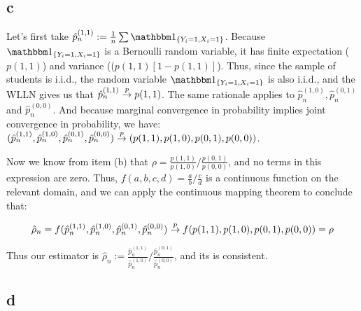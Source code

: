 \documentclass[12pt]{paper}
\begin{document}
\subsection*{c}

Let's first take $\hat{p}_{n}^{(1,1)}:=\frac{1}{n}\sum{\indicate{Y_i=1,X_i=1}}$. Because $\indicate{Y_i=1,X_i=1}$ is a Bernoulli random variable, it has finite expectation ($p(1,1)$) and variance (($p(1,1)[1-p(1,1)]$). Thus, since the sample of students is i.i.d., the random variable $\indicate{Y_i=1,X_i=1}$ is also i.i.d., and the WLLN gives us that $\hat{p}_{n}^{(1,1)}\overset{p}{\to} p(1,1)$. The same rationale applies to $\hat{p}_{n}^{(1,0)},\hat{p}_{n}^{(0,1)}$ and $\hat{p}_{n}^{(0,0)}$. And because marginal convergence in probability implies joint convergence in probability, we have: $(\hat{p}_{n}^{(1,1)},\hat{p}_{n}^{(1,0)},\hat{p}_{n}^{(0,1)},\hat{p}_{n}^{(0,0)})\overset{p}{\to}(p(1,1),p(1,0),p(0,1),p(0,0))$. 

Now we know from item (b) that $\rho=\frac{p(1,1)}{p(1,0)}\Big/\frac{p(0,1)}{p(0,0)}$, and no terms in this expression are zero. Thus, $f(a,b,c,d)=\frac{a}{b}\Big/\frac{c}{d}$ is a continuous function on the relevant domain, and we can apply the continuous mapping theorem to conclude that:

\begin{equation}
\hat{\rho}_n=f(\hat{p}_{n}^{(1,1)},\hat{p}_{n}^{(1,0)},\hat{p}_{n}^{(0,1)},\hat{p}_{n}^{(0,0)})\overset{p}{\to} f(p(1,1),p(1,0),p(0,1),p(0,0))=\rho
\end{equation}

Thus our estimator is $\hat{\rho}_n :=\frac{\hat{p}_{n}^{(1,1)}}{\hat{p}_{n}^{(1,0)}}\Big/\frac{\hat{p}_{n}^{(0,1)}}{\hat{p}_{n}^{(0,0)}}$, and its is consistent.

\subsection*{d}
\end{document}
